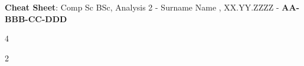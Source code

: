 \documentclass[7pt,landscape, margin = 0.1mm]{article}
\begin{document}
\syntaxonly
\centering

\scriptsize

\begin{center}
     \Large{\textbf{Cheat Sheet}: Comp Sc BSc, Analysis 2 - Surname Name , XX.YY.ZZZZ - \textbf{AA-BBB-CC-DDD}} \\
\end{center}
\begin{multicols}{4}
\setlength{\premulticols}{0.5pt}
\setlength{\postmulticols}{0.5pt}
\setlength{\multicolsep}{0.5pt}
\setlength{\columnsep}{0.2pt}
\setlength{\columnseprule}{0.4pt}

\begin{flushleft}







\end{flushleft}
\end{multicols}
\newpage
\begin{multicols}{2}

\end{multicols}
\end{document}
